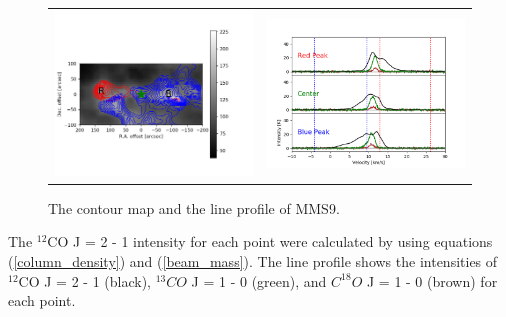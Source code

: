 \begin{figure}[h!]
	\begin{center}
		\begin{tabular}{cc}
			\includegraphics[width=7cm]{Orion_12CO2-1_MMS9_rbcontour_400_modified} &   \includegraphics[width=7cm]{Orion_12CO2-1_MMS9_line_profile_400}
		\end{tabular}	
		\caption{The contour map and the line profile of MMS9. }
	\label{fig:MMS921}
	\end{center}
\end{figure}

\clearpage
\newpage
\noindent The $^{12}$CO J = 2 - 1 intensity for each point were calculated by using equations (\ref{column_density}) and (\ref{beam_mass}). The line profile shows the intensities of $^{12}$CO J = 2 - 1 (black), $^{13}CO$ J = 1 - 0 (green), and $C^{18}O$ J = 1 - 0 (brown) for each point. 

